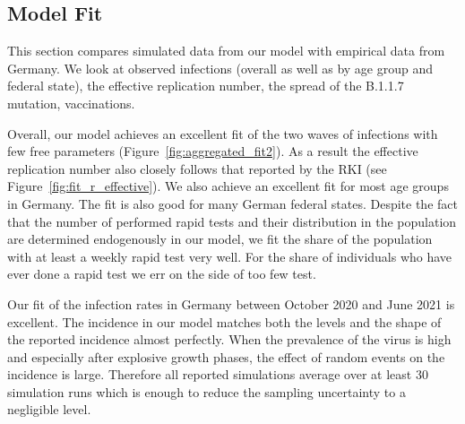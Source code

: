 \subsection{Model Fit}
\label{subsec:fit_results}

This section compares simulated data from our model with empirical data from Germany. We
look at observed infections (overall as well as by age group and federal state), the
effective replication number,  the spread of the B.1.1.7 mutation,
vaccinations.

Overall, our model achieves an excellent fit of the two waves of infections with few free
parameters (Figure~\ref{fig:aggregated_fit2}). As a result the effective replication
number also closely follows that reported by the RKI (see
Figure~\ref{fig:fit_r_effective}). We also achieve an excellent fit for most age groups
in Germany. The fit is also good for many German federal states. Despite the fact that
the number of performed rapid tests and their distribution in the population are
determined endogenously in our model, we fit the share of the population with at least a
weekly rapid test very well. For the share of individuals who have ever done a rapid
test we err on the side of too few test.

Our fit of the infection rates in Germany between October 2020 and June 2021 is
excellent. The incidence in our model matches both the levels and the shape of the
reported incidence almost perfectly. When the prevalence of the virus is high and
especially after explosive growth phases, the effect of random events on the
incidence is large. Therefore all reported simulations average over at least 30
simulation runs which is enough to reduce the sampling uncertainty to a negligible
level.

